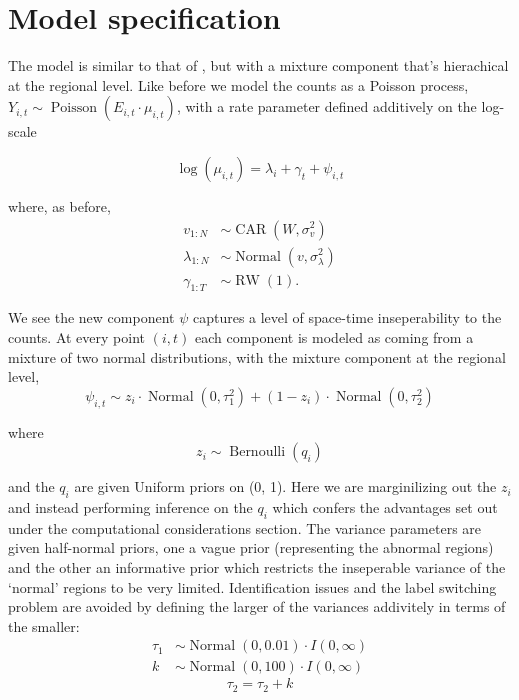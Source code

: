 \documentclass[11pt]{report}
\begin{document}
\section{Model specification}

The model is similar to that of \citet{stability}, but with a mixture component that's hierachical at the regional level. Like before we model the counts as a Poisson process, $Y_{i,t} \sim \operatorname{Poisson}(E_{i,t} \cdot \mu_{i,t})$, with a rate parameter defined additively on the log-scale

\begin{equation}
\log(\mu_{i,t}) = \lambda_i + \gamma_t + \psi_{i,t}
\end{equation}

where, as before,
\begin{align}
v_{1:N} &\sim \operatorname{CAR}(W, \sigma_v^2) \\
\lambda_{1:N} &\sim \operatorname{Normal}(v, \sigma_\lambda^2) \\
\gamma_{1:T} &\sim \operatorname{RW}(1).
\end{align}

We see the new component $\psi$ captures a level of space-time inseperability to the counts. At every point $(i, t)$ each component is modeled as coming from a mixture of two normal distributions, with the mixture component at the regional level,
\begin{equation}
\psi_{i,t} \sim z_i \cdot \operatorname{Normal}(0, \tau_1^2) + (1 - z_i) \cdot \operatorname{Normal}(0, \tau_2^2)
\end{equation} 

where
\begin{equation}
  z_i \sim \operatorname{Bernoulli}(q_i)
\end{equation}

and the $q_i$ are given Uniform priors on (0, 1). Here we are marginilizing out the $z_i$ and instead performing inference on the $q_i$ which confers the advantages set out under the computational considerations section. The variance parameters are given half-normal priors, one a vague prior (representing the abnormal regions) and the other an informative prior which restricts the inseperable variance of the `normal' regions to be very limited. Identification issues and the label switching problem are avoided by defining the larger of the variances addivitely in terms of the smaller:
\begin{align}
  \tau_1 &\sim \operatorname{Normal}(0, 0.01) \cdot I(0, \infty) \\
  k &\sim \operatorname{Normal}(0, 100) \cdot I(0, \infty)
\end{align}
\begin{equation}
 \tau_2 = \tau_2 + k
\end{equation}
\end{document}
